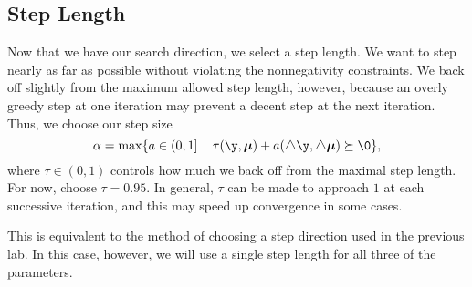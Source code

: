 \begin{comment}
Finally, we obtain our search direction $(\triangle x', \triangle y', \triangle \lambda')$ by solving the perturbed
system
\begin{equation}
\begin{bmatrix}
Q & 0 & -A^T\\
A & -I & 0\\
0 & \Lambda & \mathcal{Y}
\end{bmatrix}
\begin{bmatrix}
\triangle x'\\
\triangle y'\\
\triangle \lambda'
\end{bmatrix}
=
\begin{bmatrix}
-Qx + A^T\lambda - c\\
-Ax + y + b\\
-\Lambda\mathcal{Y}e - \triangle \Lambda\triangle\mathcal{Y}e + \sigma\nu e
\end{bmatrix}.
\label{eq:perturbed}
\end{equation}
\end{comment} %

\subsection*{Step Length}
Now that we have our search direction, we select a step length. We want to step nearly as far as possible
without violating the nonnegativity constraints. We back off slightly from the maximum allowed step length, however,
because an overly greedy step at one iteration may prevent a decent step at the next iteration. Thus,
we choose our step size
\[
\alpha = \max\{a \in (0,1] \, \mid \, \tau(\y,\Mu) +a(\triangle \y, \triangle \Mu) \succeq \0\},
\]
where $\tau \in (0,1)$ controls how much we back off from the maximal step length. For now, choose $\tau = 0.95$.
In general, $\tau$ can be made to approach $1$ at each successive iteration, and this may speed up convergence in some cases.

This is equivalent to the method of choosing a step direction used in the previous lab.
In this case, however, we will use a single step length for all three of the parameters.

